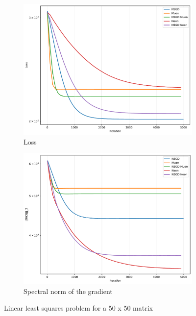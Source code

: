 \documentclass{article} %
\begin{document}
    
    \begin{figure}[h!]
        \centering
        \begin{subfigure}[t]{0.48\linewidth}
            \centering
            \includegraphics[width=\linewidth]{figs/simple_lls/loss_vs_iteration_50x50.pdf}
            \caption{Loss}
            \label{fig:lls_loss}
        \end{subfigure}
        \hfill
        \begin{subfigure}[t]{0.48\linewidth}
            \centering
            \includegraphics[width=\linewidth]{figs/simple_lls/gradient_spectral_norm_vs_iteration_50x50.pdf}
            \caption{Spectral norm of the gradient}
            \label{fig:lls_grad_norm}
        \end{subfigure}
        \caption{Linear least squares problem for a 50 x 50 matrix}
        \label{fig:lls}
                
    \end{figure}   
    
\end{document}
